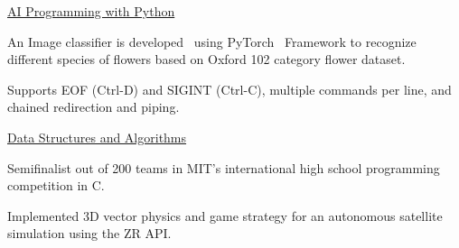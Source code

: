 
\begin{cventries}
  \cventry
    {} %
    {\href{https://confirm.udacity.com/A2AJNS3}{AI Programming with Python}} %
    {} %
    {} %
    {
      \begin{cvitems} %
        \item {An Image classifier is developed  using PyTorch  Framework to recognize different species of flowers based on Oxford 102 category flower dataset.}
		\item {Supports EOF (Ctrl-D) and SIGINT (Ctrl-C), multiple commands per line, and chained redirection and piping.}
      \end{cvitems}
    }

  \cventry
    {} %
    {\href{https://confirm.udacity.com/KU5EC5NR}{Data Structures and Algorithms}} %
    {} %
    {} %
    {
      \begin{cvitems} %
      	\item {Semifinalist out of 200 teams in MIT's international high school programming competition in C.}
		\item {Implemented 3D vector physics and game strategy for an autonomous satellite simulation using the ZR API.}
      \end{cvitems}
    }
\end{cventries}
